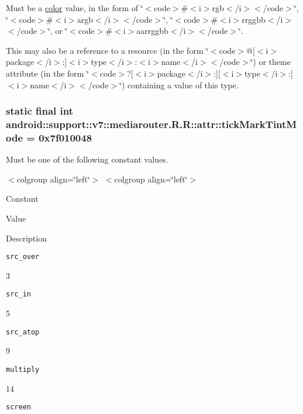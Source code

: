 Must be a \hyperlink{classandroid_1_1support_1_1v7_1_1mediarouter_1_1_r_1_1color}{color} value, in the form of \char`\"{}$<$code$>$\#$<$i$>$rgb$<$/i$>$$<$/code$>$\char`\"{}, \char`\"{}$<$code$>$\#$<$i$>$argb$<$/i$>$$<$/code$>$\char`\"{}, \char`\"{}$<$code$>$\#$<$i$>$rrggbb$<$/i$>$$<$/code$>$\char`\"{}, or \char`\"{}$<$code$>$\#$<$i$>$aarrggbb$<$/i$>$$<$/code$>$\char`\"{}. 

This may also be a reference to a resource (in the form \char`\"{}$<$code$>$@\mbox{[}$<$i$>$package$<$/i$>$:\mbox{]}$<$i$>$type$<$/i$>$:$<$i$>$name$<$/i$>$$<$/code$>$\char`\"{}) or theme attribute (in the form \char`\"{}$<$code$>$?\mbox{[}$<$i$>$package$<$/i$>$:\mbox{]}\mbox{[}$<$i$>$type$<$/i$>$:\mbox{]}$<$i$>$name$<$/i$>$$<$/code$>$\char`\"{}) containing a value of this type. \hypertarget{classandroid_1_1support_1_1v7_1_1mediarouter_1_1_r_1_1attr_c797b63ed3d7c4754c117b4a59eedd5b}{
\subsubsection[{tickMarkTintMode}]{\setlength{\rightskip}{0pt plus 5cm}static final int android::support::v7::mediarouter.R.R::attr::tickMarkTintMode = 0x7f010048}}
\label{classandroid_1_1support_1_1v7_1_1mediarouter_1_1_r_1_1attr_c797b63ed3d7c4754c117b4a59eedd5b}


Must be one of the following constant values. \begin{TabularC}{0}
\hline
\end{TabularC}
$<$colgroup align=\char`\"{}left\char`\"{}$>$ $<$colgroup align=\char`\"{}left\char`\"{}$>$ 

Constant

Value

Description 

{\tt src\_\-over}

3

{\tt src\_\-in}

5

{\tt src\_\-atop}

9

{\tt multiply}

14

{\tt screen}


